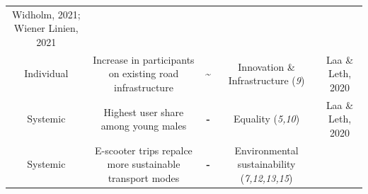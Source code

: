 \documentclass[
]{book}
\begin{document}
\begin{longtable}[]{@{}ccccc@{}}
\begin{minipage}[t]{0.17\columnwidth}
Widholm, 2021; Wiener Linien, 2021\strut
\end{minipage}\tabularnewline
\begin{minipage}[t]{0.17\columnwidth}\centering
Individual\strut
\end{minipage} & \begin{minipage}[t]{0.16\columnwidth}\centering
Increase in participants on existing road infrastructure\strut
\end{minipage} & \begin{minipage}[t]{0.17\columnwidth}\centering
\textbf{\textasciitilde{}}\strut
\end{minipage} & \begin{minipage}[t]{0.17\columnwidth}\centering
Innovation \& Infrastructure (\emph{9})\strut
\end{minipage} & \begin{minipage}[t]{0.17\columnwidth}\centering
Laa \& Leth, 2020\strut
\end{minipage}\tabularnewline
\begin{minipage}[t]{0.17\columnwidth}\centering
Systemic\strut
\end{minipage} & \begin{minipage}[t]{0.16\columnwidth}\centering
Highest user share among young males\strut
\end{minipage} & \begin{minipage}[t]{0.17\columnwidth}\centering
\textbf{-}\strut
\end{minipage} & \begin{minipage}[t]{0.17\columnwidth}\centering
Equality (\emph{5,10})\strut
\end{minipage} & \begin{minipage}[t]{0.17\columnwidth}\centering
Laa \& Leth, 2020\strut
\end{minipage}\tabularnewline
\begin{minipage}[t]{0.17\columnwidth}\centering
Systemic\strut
\end{minipage} & \begin{minipage}[t]{0.16\columnwidth}\centering
E-scooter trips repalce more sustainable transport modes\strut
\end{minipage} & \begin{minipage}[t]{0.17\columnwidth}\centering
\textbf{-}\strut
\end{minipage} & \begin{minipage}[t]{0.17\columnwidth}\centering
Environmental sustainability (\emph{7,12,13,15})\strut
\end{minipage} & \begin{minipage}[t]{0.17\columnwidth}\centering

\end{minipage}
\end{longtable}
\end{document}
